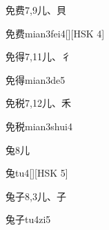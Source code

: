 \begin{entry}{免费}{7,9}{⼉、⾙}
  \begin{phonetics}{免费}{mian3fei4}[][HSK 4]
  \end{phonetics}
\end{entry}

\begin{entry}{免得}{7,11}{⼉、⼻}
  \begin{phonetics}{免得}{mian3de5}
  \end{phonetics}
\end{entry}

\begin{entry}{免税}{7,12}{⼉、⽲}
  \begin{phonetics}{免税}{mian3shui4}
  \end{phonetics}
\end{entry}

\begin{entry}{兔}{8}{⼉}
  \begin{phonetics}{兔}{tu4}[][HSK 5]
  \end{phonetics}
\end{entry}

\begin{entry}{兔子}{8,3}{⼉、⼦}
  \begin{phonetics}{兔子}{tu4zi5}
  \end{phonetics}
\end{entry}



